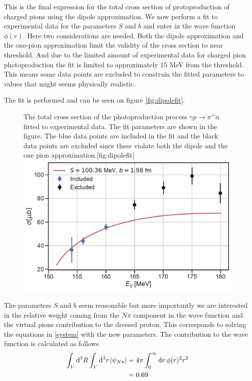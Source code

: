 This is the final expression for the total cross section of protoproduction of charged pions using the dipole approximation. We now perform a fit to experimental data for the parameters $S$ and $b$ and enter in the wave function $\phi(r)$. Here two considerations are needed. Both the dipole approximation and the one-pion approximation limit the validity of the cross section to near threshold. And due to the limited amount of experimental data for charged pion photoproduction the fit is limited to approximately $15$ MeV from the threshold. This means some data points are excluded to constrain the fitted parameters to values that might seems physically realistic. 

The fit is performed and can be seen on figure \ref{fig:dipolefit}.
\begin{figure}[H]
    \begin{sidecaption}{The total cross section of the photoproduction process $\gamma p \rightarrow \pi^+ n$ fitted to experimental data. The fit parameters are shown in the figure. The blue data points are included in the fit and the black data points are excluded since these violate both the dipole and the one pion approximation.}[fig:dipolefit]
    \includegraphics[width=\linewidth]{Figures/dipole_approximation.pdf}
    \end{sidecaption}
\end{figure}
The parameters $S$ and $b$ seem reasonable but more importantly we are interested in the relative weight coming from the $N\pi$ component in the wave function and the virtual pions contribution to the dressed proton. This corresponds to solving the equations in \eqref{system} with the new parameters. The contribution to the wave function is calculated as follows
\begin{align}
    \int_V \text{d}^3R \int_V \text{d}^3 r \, \abs{\psi_{N\pi}} &= 4\pi \int_0^\infty \text{d}r \, \phi(r)^2r^2 \\
    &= 0.69
\end{align}
